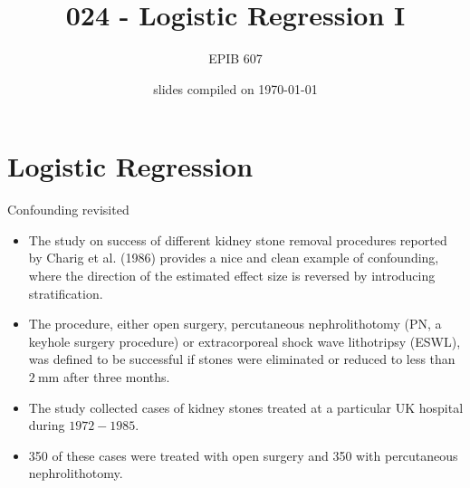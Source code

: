 \documentclass[10pt,handout]{beamer}\usepackage[]{graphicx}\usepackage[]{color}
\begin{document}
	
	
	


	
	\title{024 - Logistic Regression I}
	\author{EPIB 607}
	
	\date{slides compiled on \today}
	
	\maketitle
	
	


\section{Logistic Regression}

\begin{frame}{Confounding revisited}

\begin{itemize}
	\item The study on success of different kidney stone removal procedures reported by Charig et al. (1986) provides a nice and clean example of confounding, where the direction of the estimated effect size is reversed by introducing stratification.
\item The procedure, either open surgery, percutaneous nephrolithotomy (PN, a keyhole surgery procedure) or extracorporeal shock wave lithotripsy (ESWL), was defined to be successful if stones were eliminated or reduced to less than $2 \mathrm{~mm}$ after three months.
\item The study collected cases of kidney stones treated at a particular UK hospital during $1972-1985$.
\item 350 of these cases were treated with open surgery and 350 with percutaneous nephrolithotomy.
\end{itemize}
\end{frame}
\end{document}
